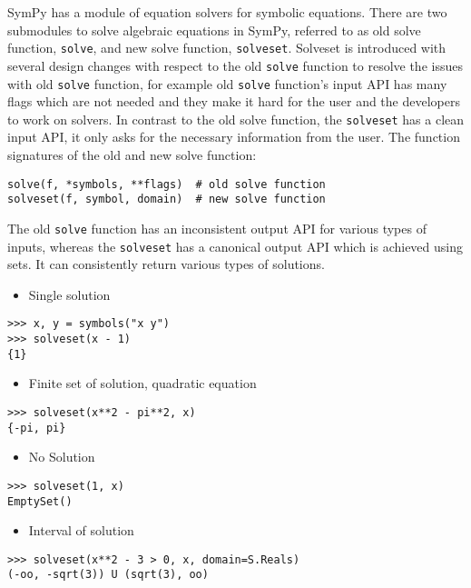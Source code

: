 

SymPy has a module of equation solvers for symbolic equations. There are two
submodules to solve algebraic equations in SymPy, referred to as old solve
function, \texttt{solve}, and new solve function, \texttt{solveset}.
Solveset is introduced with several design changes with respect to the old
\texttt{solve} function to resolve the issues with old \texttt{solve} function,
for example old \texttt{solve} function's input API has many flags which are
not needed and they make it hard for the user and the developers to work on
solvers. In contrast to the old solve function, the \texttt{solveset} has a
clean input API, it only asks for the necessary information from the user.
The function signatures of the old and new solve function:
\begin{verbatim}
solve(f, *symbols, **flags)  # old solve function
solveset(f, symbol, domain)  # new solve function
\end{verbatim}
The old \texttt{solve} function has an inconsistent output API for various types
of inputs, whereas the \texttt{solveset} has a canonical output API which is
achieved using sets. It can consistently return various types of solutions.

\begin{itemize}
\item Single solution
\end{itemize}
\begin{verbatim}
>>> x, y = symbols("x y")
>>> solveset(x - 1)
{1}

\end{verbatim}

\begin{itemize}
\item Finite set of solution, quadratic equation
\end{itemize}
\begin{verbatim}
>>> solveset(x**2 - pi**2, x)
{-pi, pi}

\end{verbatim}

\begin{itemize}
\item No Solution
\end{itemize}
\begin{verbatim}
>>> solveset(1, x)
EmptySet()

\end{verbatim}

\begin{itemize}
\item Interval of solution
\end{itemize}
\begin{verbatim}
>>> solveset(x**2 - 3 > 0, x, domain=S.Reals)
(-oo, -sqrt(3)) U (sqrt(3), oo)

\end{verbatim}

